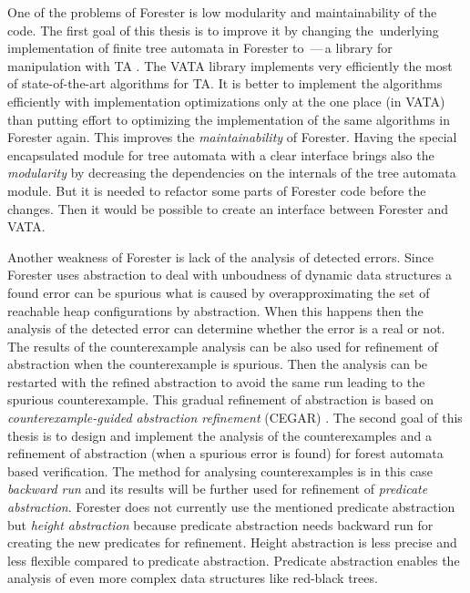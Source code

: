 One of the problems of Forester is low modularity and maintainability of the code.
The first goal of this thesis is to improve it by changing the~underlying implementation
of finite tree automata in Forester to \vata\,---\,a library for manipulation with TA \cite{libvata}.
The VATA library implements very efficiently the most of state-of-the-art algorithms for TA.
It is better to implement the algorithms efficiently with implementation optimizations
only at the one place (in VATA) than putting effort to optimizing the implementation
of the same algorithms in Forester again.
This improves the \emph{maintainability} of Forester.
Having the special encapsulated module for tree automata with a clear interface
brings also the \emph{modularity} by decreasing the dependencies on the internals of
the tree automata module.
But it is needed to refactor some parts of Forester code before the changes.
Then it would be possible to create an interface between Forester and VATA.

Another weakness of Forester is lack of the analysis of detected errors.
Since Forester uses abstraction to deal with unboudness of dynamic data structures
a found error can be spurious what is caused by overapproximating
the set of reachable heap configurations by abstraction.
When this happens then the analysis of the detected error can determine
whether the error is a real or not.
The results of the counterexample analysis can be also used for refinement of abstraction
when the counterexample is spurious.
Then the analysis can be restarted with the refined abstraction
to avoid the same run leading to the spurious counterexample.
This gradual refinement of abstraction is based on \emph{counterexample-guided abstraction refinement} (CEGAR) \cite{cegar}.
The second goal of this thesis is to design and implement the analysis of the counterexamples
and a refinement of abstraction (when a spurious error is found) for forest automata based verification.
The method for analysing counterexamples is in this case \emph{backward run}
and its results will be further used for refinement of \emph{predicate abstraction}.
Forester does not currently use the mentioned predicate abstraction but \emph{height abstraction}
because predicate abstraction needs backward run for creating the new predicates for refinement.
Height abstraction is less precise and less flexible compared to predicate abstraction.
Predicate abstraction enables the analysis of even more complex data structures like red-black trees.


